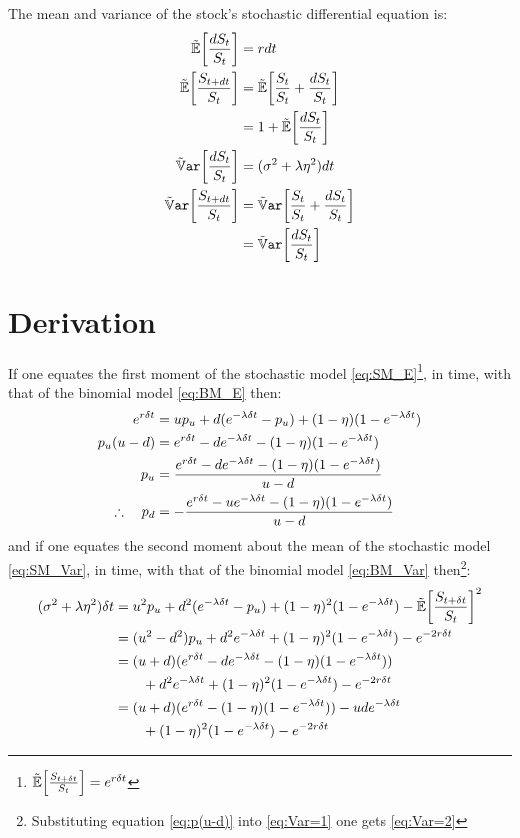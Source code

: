 \documentclass[a4paper,11pt,oneside]{report}
\theoremstyle{plain}
\theoremstyle{definition}
\begin{document}
The mean and variance of the stock's stochastic differential equation is:
\begin{align}
 \E[\frac{\dS}{\S}]    &= r\dt \\
 \E[\frac{\Sdt}{\S}]   &= \E[\frac{\S}{\S} + \frac{\dS}{\S}] \n
                       &= 1 + \E[\frac{\dS}{\S}] \label{eq:SM_E} \\
 \Var[\frac{\dS}{\S}]  &= (\sigma^2 + \lambda\eta^2)\dt \\
 \Var[\frac{\Sdt}{\S}] &= \Var[\frac{\S}{\S} + \frac{\dS}{\S}] \n
                       &= \Var[\frac{\dS}{\S}] \label{eq:SM_Var}
\end{align}



\section{Derivation}
If one equates the first moment of the stochastic model \eqref{eq:SM_E}\footnote{$\E[\frac{\SDt}{\S}] = e^{r\Dt}$}, in \Dt time, with that of the binomial model \eqref{eq:BM_E} then:
\begin{align}
 e^{r\delta t}       &= up_u + d(e^{-\lambda\delta t} - p_u) + (1 - \eta)(1 - e^{-\lambda\delta t}) \nonumber\\
 p_u(u - d)   &= e^{r\delta t} - d e^{-\lambda\delta t} - (1 - \eta)(1 - e^{-\lambda\delta t}) \label{eq:p(u-d)}\\
 p_u            &= \frac{e^{r\delta t} - d e^{-\lambda\delta t} - (1 - \eta)(1 - e^{-\lambda\delta t})}{u - d} \\
 \therefore\quad p_d &= -\frac{e^{r\delta t} - u e^{-\lambda\delta t} - (1 - \eta)(1 - e^{-\lambda\delta t})}{u - d}
\end{align}
and if one equates the second moment about the mean of the stochastic model \eqref{eq:SM_Var}, in \Dt time, with that of the binomial model \eqref{eq:BM_Var} then\footnote{Substituting equation \eqref{eq:p(u-d)} into \eqref{eq:Var=1} one gets \eqref{eq:Var=2}}:
\begin{align}
 (\sigma^2 + \lambda\eta^2)\Dt &= \u^2\pu + \d^2(e^{-\lambda\Dt} - \pu) + (1 - \eta)^2(1 - e^{-\lambda\Dt}) - \E[\frac{\SDt}{\S}]^2 \n
                        &= (\u^2 - \d^2)\pu + \d^2 e^{-\lambda\Dt} +  (1 - \eta)^2(1 - e^{-\lambda\Dt}) - e^{-2r\Dt} \label{eq:Var=1} \\
                        &= (\u + \d)(e^{r\Dt} - \d e^{-\lambda\Dt} - (1 - \eta)(1 - e^{-\lambda\Dt})) \label{eq:Var=2} \\
                        &\qquad + \d^2 e^{-\lambda\Dt} + (1 - \eta)^2(1 - e^{-\lambda\Dt}) - e^{-2r\Dt} \n
                        &= (\u + \d)(e^{r\Dt} - (1 - \eta)(1 - e^{-\lambda\Dt})) - \u\d e^{-\lambda\Dt} \label{eq:Var=} \\
                        &\qquad + (1 - \eta)^2(1 - e^{-\lambda\Dt}) - e^{-2r\Dt} \nonumber
\end{align}
\end{document}
